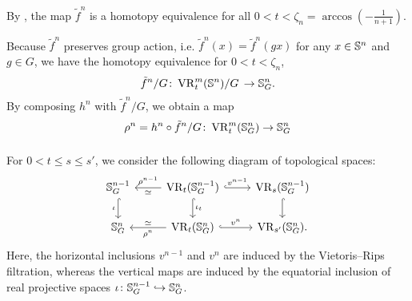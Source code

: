 By \cite[Proposition 5.3]{adamaszek2018metric}, the map $\tilde{f}^n$ is a homotopy equivalence for all $0<t<\zeta_n=\arccos{(-\tfrac{1}{n+1})}$.


Because $\tilde{f}^n$ preserves group action, i.e. $\tilde{f}^n(x) = \tilde{f}^n(gx)$ for any $x\in \mathbb{S}^n$ and $g\in G$, we have the homotopy equivalence for $0<t<\zeta_n$, %
\[
\tilde{f}^n/G \colon 
\operatorname{VR}_t^m(\mathbb{S}^n)/G \, 
\to \mathbb{S}^n_G.
\]
By composing $h^n$ with $\tilde{f}^n/G$, we obtain a map 
\[
\rho^n = h^n \circ \tilde{f}^n/G 
\colon \operatorname{VR}_t^m(\mathbb{S}^n_G) \to \mathbb{S}^n_G
\]

\subsubsection{} 

For $0<t\leq s \leq s'$, we consider the following diagram of topological spaces:
\begin{equation}\label{d:fundamental_bars_diagram}
    \begin{tikzcd}
        \bS^{n-1}_G
        \ar[d, hook,"{\iota}" left]
        &
        \VR_t(\bS^{n-1}_G)
        \ar[d, hook,"\iota_t"]
        \ar[l, "\rho^{n-1}" above, "\simeq" below]
        \ar[r, hook, "v^{n-1}"]
        &
        \VR_{s}(\bS^{n-1}_G)
        \ar[d, hook]
        \\
        \bS^{n}_G
        &
        \VR_t(\bS^{n}_G)
        \ar[l, "\rho^n" below, "\simeq" above]
        \ar[r, hook, "v^{n}"]
        &
        \VR_{s'}(\bS^{n}_G).
    \end{tikzcd}
\end{equation}
Here, the horizontal inclusions $v^{n-1}$ and $v^n$ are induced by the Vietoris--Rips filtration, whereas the vertical maps are induced by the equatorial inclusion of real projective spaces $\iota \colon \mathbb{S}^{n-1}_G \hookrightarrow \mathbb{S}^{n}_G$.

